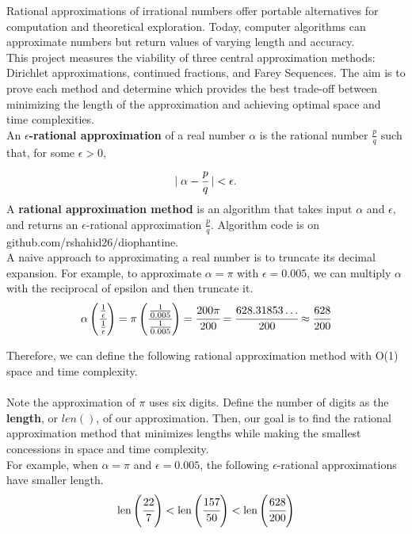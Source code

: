 \documentclass[11pt]{article}
\title{}
\date{}
\begin{document}
Rational approximations of irrational numbers offer portable alternatives for computation and theoretical exploration. Today, computer algorithms can approximate numbers but return values of varying length and accuracy.\\

This project measures the viability of three central approximation methods: Dirichlet approximations, continued fractions, and Farey Sequences. The aim is to prove each method and determine which provides the best trade-off between minimizing the length of the approximation and achieving optimal space and time complexities. \\

An \textbf{$\epsilon$-rational approximation} of a real number $\alpha$ is the rational number $\frac{p}{q}$ such that, for some $\epsilon > 0$,
\vspace{-1em}
\begin{align*}
    |\phantom{.}\alpha - \cfrac{p}{q}\phantom{.}|  < \epsilon.
\end{align*}
A \textbf{rational approximation method} is an algorithm that takes input $\alpha$ and $\epsilon$, and returns an $\epsilon$-rational approximation $\frac{p}{q}$. Algorithm code is on github.com/rshahid26/diophantine.\\

A naive approach to approximating a real number is to truncate its decimal expansion. For example, to approximate $\alpha = \pi$ with $\epsilon = 0.005$, we can multiply $\alpha$ with the reciprocal of epsilon and then truncate it.
\begin{align*}
\alpha\left(\cfrac{\frac{1}{\epsilon}}{\frac{1}{\epsilon}}\right) = \pi\left(\cfrac{\frac{1}{0.005}}{\frac{1}{0.005}}\right) = \cfrac{200\pi}{200} = \cfrac{628.31853 \dots}{200} \approx \cfrac{628}{200}
\end{align*}

Therefore, we can define the following rational approximation method with O(1) space and time complexity.\\\\

Note the approximation of $\pi$ uses six digits. Define the number of digits as the \textbf{length}, or $\textit{len}()$, of our approximation. Then, our goal is to find the rational approximation method that minimizes lengths while making the smallest concessions in space and time complexity.\\

For example, when $\alpha=\pi$ and $\epsilon=0.005$, the following $\epsilon$-rational approximations have smaller length.
\begin{align*}
\text{len}\left(\cfrac{22}{7}\right) < \text{len}\left(\cfrac{157}{50}\right) < \text{len}\left(\cfrac{628}{200}\right)
\end{align*}
\end{document}
